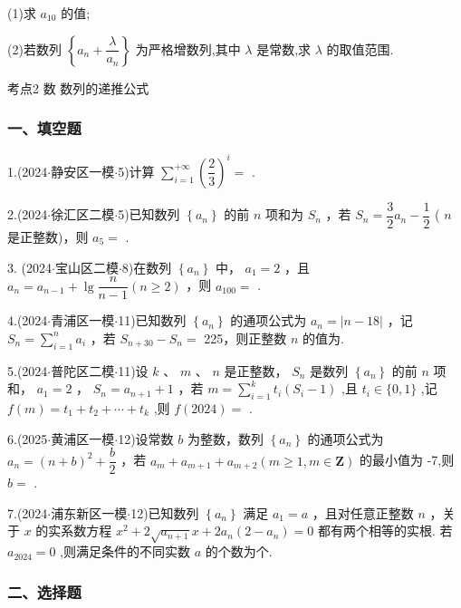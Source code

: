 (1)求 ${a}_{10}$ 的值;

(2)若数列 $\left\{  {{a}_{n} + \dfrac{\lambda }{{a}_{n}}}\right\}$ 为严格增数列,其中 $\lambda$ 是常数,求 $\lambda$ 的取值范围.

考点2 数 数列的递推公式

\subsubsection*{一、填空题}

1.(2024$\cdot$静安区一模$\cdot$5)计算 $\mathop{\sum }\limits_{{i = 1}}^{{+\infty }}{\left( \dfrac{2}{3}\right) }^{i} =$ \blkda[2]{}.

2.(2024$\cdot$徐汇区二模$\cdot$5)已知数列 $\left\{  {a}_{n}\right\}$ 的前 $n$ 项和为 ${S}_{n}$ ，若 ${S}_{n} = \dfrac{3}{2}{a}_{n} - \dfrac{1}{2}$ ( $n$ 是正整数)，则 ${a}_{5} =$ \blkda[2]{}.

3. (2024$\cdot$宝山区二模$\cdot$8)在数列 $\left\{  {a}_{n}\right\}$ 中， ${a}_{1} = 2$ ，且 ${a}_{n} = {a}_{n - 1} + \lg \dfrac{n}{n - 1}\left( {n \geq  2}\right)$ ，则 ${a}_{100} =$ \blkda[2]{}.

4.(2024$\cdot$青浦区一模$\cdot$11)已知数列 $\left\{  {a}_{n}\right\}$ 的通项公式为 ${a}_{n} = \left| {n - {18}}\right|$ ，记 ${S}_{n} = \mathop{\sum }\limits_{{i = 1}}^{n}{a}_{i}$ ，若 ${S}_{n + {30}} - {S}_{n} =$ 225，则正整数 $n$ 的值为\blkda[2]{}.

5.(2024$\cdot$普陀区二模$\cdot$11)设 $k$ 、 $m$ 、 $n$ 是正整数， ${S}_{n}$ 是数列 $\left\{  {a}_{n}\right\}$ 的前 $n$ 项和， ${a}_{1} = 2$ ， ${S}_{n} = {a}_{n + 1} + 1$ ，若 $m = \mathop{\sum }\limits_{{i = 1}}^{k}{t}_{i}\left( {{S}_{i} - 1}\right)$ ,且 ${t}_{i} \in  \{ 0,1\}$ ,记 $f\left( m\right)  = {t}_{1} + {t}_{2} + \cdots  + {t}_{k}$ ,则 $f\left( {2024}\right)  =$ \blkda[2]{}.

6.(2025$\cdot$黄浦区一模$\cdot$12)设常数 $b$ 为整数，数列 $\left\{  {a}_{n}\right\}$ 的通项公式为 ${a}_{n} = {\left( n + b\right) }^{2} + \dfrac{b}{2}$ ，若 ${a}_{m} + {a}_{m + 1} +  {a}_{m + 2}\left( {m \geq  1,m \in  \mathbf{Z}}\right)$ 的最小值为 -7,则 $b =$ \blkda[2]{}.

7.(2024$\cdot$浦东新区一模$\cdot$12)已知数列 $\left\{  {a}_{n}\right\}$ 满足 ${a}_{1} = a$ ，且对任意正整数 $n$ ，关于 $x$ 的实系数方程 ${x}^{2} + 2\sqrt{{a}_{n + 1}}x + 2{a}_{n}\left( {2 - {a}_{n}}\right)  = 0$ 都有两个相等的实根. 若 ${a}_{2024} = 0$ ,则满足条件的不同实数 $a$ 的个数为\blkda[2]{}个.

\subsubsection*{二、选择题}


